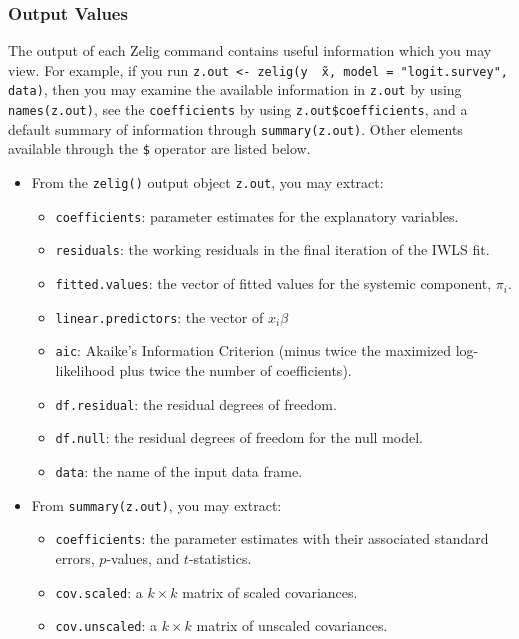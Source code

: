 \subsubsection{Output Values}

The output of each Zelig command contains useful information which you
may view.  For example, if you run \texttt{z.out <- zelig(y \~\ x,
  model = "logit.survey", data)}, then you may examine the available
information in \texttt{z.out} by using \texttt{names(z.out)},
see the {\tt coefficients} by using {\tt z.out\$coefficients}, and
a default summary of information through \texttt{summary(z.out)}.
Other elements available through the {\tt \$} operator are listed
below.

\begin{itemize}
\item From the {\tt zelig()} output object {\tt z.out}, you may
  extract:
   \begin{itemize}
   \item {\tt coefficients}: parameter estimates for the explanatory
     variables.
   \item {\tt residuals}: the working residuals in the final iteration
     of the IWLS fit.
   \item {\tt fitted.values}: the vector of fitted values for the
     systemic component, $\pi_i$.
   \item {\tt linear.predictors}: the vector of $x_{i}\beta$
   \item {\tt aic}: Akaike's Information Criterion (minus twice the
     maximized log-likelihood plus twice the number of coefficients).
   \item {\tt df.residual}: the residual degrees of freedom.
   \item {\tt df.null}: the residual degrees of freedom for the null
     model.
   \item {\tt data}: the name of the input data frame.  
   \end{itemize}

\item From {\tt summary(z.out)}, you may extract: 
   \begin{itemize}
   \item {\tt coefficients}: the parameter estimates with their
     associated standard errors, $p$-values, and $t$-statistics.
   \item{\tt cov.scaled}: a $k \times k$ matrix of scaled covariances.
   \item{\tt cov.unscaled}: a $k \times k$ matrix of unscaled
     covariances.  
   \end{itemize}


\end{itemize}
